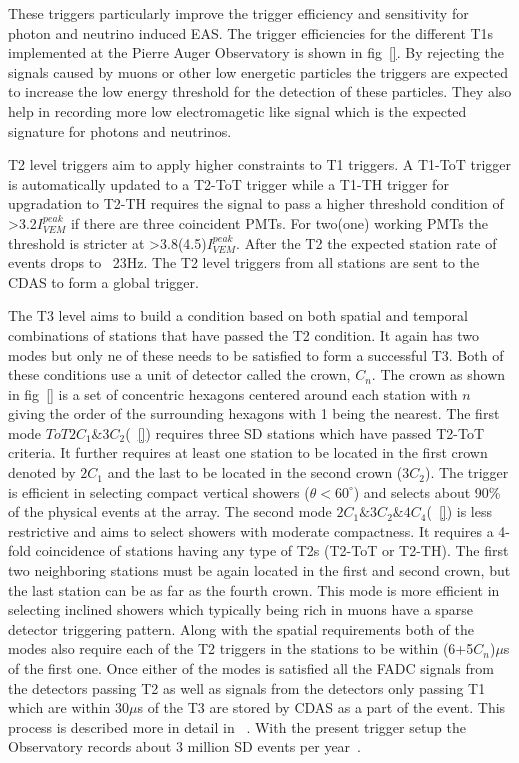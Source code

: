 These triggers particularly improve the trigger efficiency and sensitivity for photon and neutrino induced EAS. The trigger efficiencies for the different T1s implemented at the Pierre Auger Observatory is shown in fig~\ref{}. By rejecting the signals caused by muons or other low energetic particles the triggers are expected to increase the low energy threshold for the detection of these particles. They also help in recording more low electromagetic like signal which is the expected signature for photons and neutrinos. 

T2 level triggers aim to apply higher constraints to T1 triggers. A T1-ToT trigger is automatically updated to a T2-ToT trigger while a T1-TH trigger for upgradation to T2-TH requires the signal to pass a higher threshold condition of >3.2$I_{VEM}^{peak}$ if there are three coincident PMTs. For two(one) working PMTs the threshold is stricter at >3.8(4.5)$I_{VEM}^{peak}$. After the T2 the expected station rate of events drops to ~23Hz. The T2 level triggers from all stations are sent to the CDAS to form a global trigger.

The T3 level aims to build a condition based on both spatial and temporal combinations of stations that have passed the T2 condition. It again has two modes but only ne of these needs to be satisfied to form a successful T3. Both of these conditions use a unit of detector called the crown, $C_n$. The crown as shown in fig~\ref{} is a set of concentric hexagons centered around each station with $n$ giving the order of the surrounding hexagons with 1 being the nearest. The first mode $ToT2C_1\&3C_2$(~\ref{}) requires three SD stations which have passed T2-ToT criteria. It further requires at least one station to be located in the first crown denoted by $2C_1$ and the last to be located in the second crown ($3C_2$). The trigger is efficient in selecting compact vertical showers ($\theta < 60^{\circ}$) and selects about 90\% of the physical events at the array. The second mode $2C_1\&3C_2\&4C_4$(~\ref{}) is less restrictive and aims to select showers with moderate compactness. It requires a 4-fold coincidence of stations having any type of T2s (T2-ToT or T2-TH). The first two neighboring stations must be again located in the first and second crown, but the last station can be as far as the fourth crown. This mode is more efficient in selecting inclined showers which typically being rich in muons have a sparse detector triggering pattern. Along with the spatial requirements both of the modes also require each of the T2 triggers in the stations to be within (6+5$C_n$)$\mu$s of the first one. Once either of the modes is satisfied all the FADC signals from the detectors passing T2 as well as signals from the detectors only passing T1 which are within 30$\mu$s of the T3 are stored by CDAS as a part of the event. This process is described more in detail in ~\cite{}. With the present trigger setup the Observatory records about 3 million SD events per year~\cite{}. 

